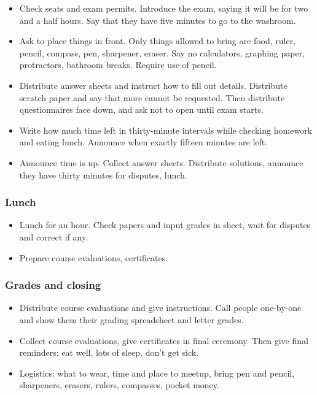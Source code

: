 \documentclass[10pt,paper=letter]{scrartcl}
\begin{document}
\begin{itemize}
  \item Check seats and exam permits. Introduce the exam, saying it will be for two and a half hours. Say that they have five minutes to go to the washroom.
  \item Ask to place things in front. Only things allowed to bring are food, ruler, pencil, compass, pen, sharpener, eraser. Say no calculators, graphing paper, protractors, bathroom breaks. Require use of pencil.
  \item Distribute answer sheets and instruct how to fill out details. Distribute scratch paper and say that more cannot be requested. Then distribute questionnaires face down, and ask not to open until exam starts.
  \item Write how much time left in thirty-minute intervals while checking homework and eating lunch. Announce when exactly fifteen minutes are left.
  \item Announce time is up. Collect answer sheets. Distribute solutions, announce they have thirty minutes for disputes, lunch.
\end{itemize}

\subsubsection*{Lunch}

\begin{itemize}
  \item Lunch for an hour. Check papers and input grades in sheet, wait for disputes and correct if any.
  \item Prepare course evaluations, certificates.
\end{itemize}

\subsubsection*{Grades and closing}

\begin{itemize}
  \item Distribute course evaluations and give instructions. Call people one-by-one and show them their grading spreadsheet and letter grades.
  \item Collect course evaluations, give certificates in final ceremony. Then give final reminders: eat well, lots of sleep, don't get sick.
  \item Logistics: what to wear, time and place to meetup, bring pen and pencil, sharpeners, erasers, rulers, compasses, pocket money. 
\end{itemize}
\end{document}
